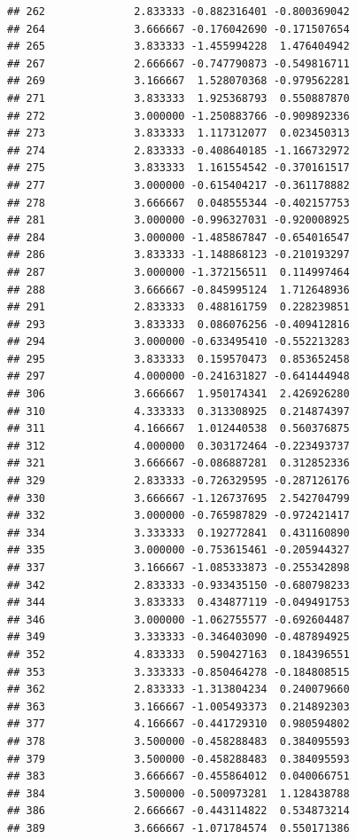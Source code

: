 \documentclass[
]{article}
\begin{document}
\begin{verbatim}
## 262              2.833333 -0.882316401 -0.800369042
## 264              3.666667 -0.176042690 -0.171507654
## 265              3.833333 -1.455994228  1.476404942
## 267              2.666667 -0.747790873 -0.549816711
## 269              3.166667  1.528070368 -0.979562281
## 271              3.833333  1.925368793  0.550887870
## 272              3.000000 -1.250883766 -0.909892336
## 273              3.833333  1.117312077  0.023450313
## 274              2.833333 -0.408640185 -1.166732972
## 275              3.833333  1.161554542 -0.370161517
## 277              3.000000 -0.615404217 -0.361178882
## 278              3.666667  0.048555344 -0.402157753
## 281              3.000000 -0.996327031 -0.920008925
## 284              3.000000 -1.485867847 -0.654016547
## 286              3.833333 -1.148868123 -0.210193297
## 287              3.000000 -1.372156511  0.114997464
## 288              3.666667 -0.845995124  1.712648936
## 291              2.833333  0.488161759  0.228239851
## 293              3.833333  0.086076256 -0.409412816
## 294              3.000000 -0.633495410 -0.552213283
## 295              3.833333  0.159570473  0.853652458
## 297              4.000000 -0.241631827 -0.641444948
## 306              3.666667  1.950174341  2.426926280
## 310              4.333333  0.313308925  0.214874397
## 311              4.166667  1.012440538  0.560376875
## 312              4.000000  0.303172464 -0.223493737
## 321              3.666667 -0.086887281  0.312852336
## 329              2.833333 -0.726329595 -0.287126176
## 330              3.666667 -1.126737695  2.542704799
## 332              3.000000 -0.765987829 -0.972421417
## 334              3.333333  0.192772841  0.431160890
## 335              3.000000 -0.753615461 -0.205944327
## 337              3.166667 -1.085333873 -0.255342898
## 342              2.833333 -0.933435150 -0.680798233
## 344              3.833333  0.434877119 -0.049491753
## 346              3.000000 -1.062755577 -0.692604487
## 349              3.333333 -0.346403090 -0.487894925
## 352              4.833333  0.590427163  0.184396551
## 353              3.333333 -0.850464278 -0.184808515
## 362              2.833333 -1.313804234  0.240079660
## 363              3.166667 -1.005493373  0.214892303
## 377              4.166667 -0.441729310  0.980594802
## 378              3.500000 -0.458288483  0.384095593
## 379              3.500000 -0.458288483  0.384095593
## 383              3.666667 -0.455864012  0.040066751
## 384              3.500000 -0.500973281  1.128438788
## 386              2.666667 -0.443114822  0.534873214
## 389              3.666667 -1.071784574  0.550171386

\end{verbatim}
\end{document}
